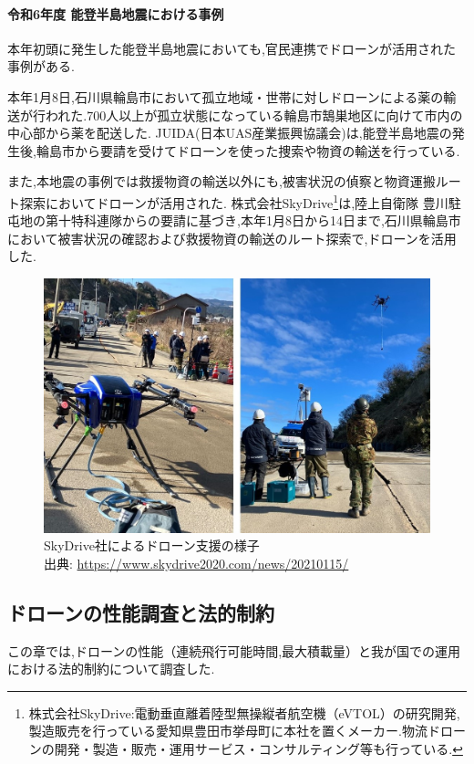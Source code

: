 \documentclass{article}[jsarticle]
\begin{document}
\paragraph{令和6年度 能登半島地震における事例}
本年初頭に発生した能登半島地震においても,官民連携でドローンが活用された事例がある.\par 
本年1月8日,石川県輪島市において孤立地域・世帯に対しドローンによる薬の輸送が行われた.700人以上が孤立状態になっている輪島市鵠巣地区に向けて市内の中心部から薬を配送した\cite{news04}.
JUIDA(日本UAS産業振興協議会)は,能登半島地震の発生後,輪島市から要請を受けてドローンを使った捜索や物資の輸送を行っている.\par 
また,本地震の事例では救援物資の輸送以外にも,被害状況の偵察と物資運搬ルート探索においてドローンが活用された.
株式会社SkyDrive\footnote{株式会社SkyDrive:電動垂直離着陸型無操縦者航空機（eVTOL）の研究開発,製造販売を行っている愛知県豊田市挙母町に本社を置くメーカー.物流ドローンの開発・製造・販売・運用サービス・コンサルティング等も行っている.}は,陸上自衛隊 豊川駐屯地の第十特科連隊からの要請に基づき,本年1月8日から14日まで,石川県輪島市において被害状況の確認および救援物資の輸送のルート探索で,ドローンを活用した\cite{news05}.
\begin{figure}[H]
    \centering
    \includegraphics[scale=0.2]{./Images/202401311838.jpg}
    \captionsetup{justification=centering}
    \caption{
        SkyDrive社によるドローン支援の様子 \\
        出典: \url{https://www.skydrive2020.com/news/20210115/}
    }
\end{figure}

\subsection{ドローンの性能調査と法的制約}
この章では,ドローンの性能（連続飛行可能時間,最大積載量）と我が国での運用における法的制約について調査した.
\end{document}
